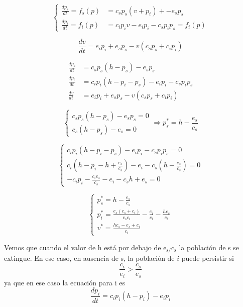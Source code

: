 \documentclass[twocolumn,aps,prl]{revtex4-1}
\begin{document}
$$
\left\{ 
    \begin{aligned}
        \frac{d p_{s}}{d t} = f_{s}(p) &= c_{s} p_{s}\left(v+p_{i}\right)+-e_{s} p_{s} \\
        \frac{d p_{i}}{d t} = f_{i}(p) &= c_{i} p_{i} v-e_{i} p_{i}-c_{s} p_{i} p_{s}=f_{i}(p)
    \end{aligned}
\right.
$$

$$
\frac{d v}{d t}=e_{i} p_{i}+e_{s} p_{s}-v\left(c_{s} p_{s}+c_{i} p_{i}\right)
$$

$$
\begin{aligned}
    \frac{d p_{s}}{d t} &= c_{s} p_{s}\left(h-p_{s}\right)-e_{s} p_{s} \\
    \frac{d p_{i}}{d t} &= c_{i} p_{i}\left(h-p_{i}-p_{s}\right)-e_{i} p_{i}-c_{s} p_{i} p_{s} \\
    \frac{d     v}{d t} &= e_{i} p_{i}+e_{s} p_{s}-v\left(c_{s} p_{s}+c_{i} p_{i}\right)
\end{aligned}
$$

$$
\left\{
\begin{array}{l}
    c_{s} p_{s}\left(h-p_{s}\right)-e_{s} p_{s}=0 \\
    c_{s}\left(h-p_{s}\right)-e_{s}=0
\end{array} 
\Rightarrow 
p_{s}^{*}=h-\frac{e_{s}}{c_{s}}
\right.
$$

\begin{equation}
    \left\{
    \begin{array}{l}
    c_{i} p_{i}\left(h-p_{i}-p_{s}\right)-e_{i} p_{i}-c_{s} p_{i} p_{s}=0 \\
    c_{i}\left(h-p_{i}-h+\frac{e_{s}}{c_{s}}\right)-e_{i}-c_{s}\left(h-\frac{e_{s}}{c_{s}}\right)=0 \\
    -c_{i} p_{i}-\frac{c_{i} e_{s}}{c_{s}}-e_{i}-c_{s} h+e_{s}=0
    \end{array}
    \right.
\end{equation}

\begin{equation}
    \left\{\begin{array}{l}
    p_{s}^{*}=h-\frac{e_{s}}{c_{s}} \\
    p_{i}^{*}=\frac{e_{s}\left(c_{s}+c_{i}\right)}{c_{s} c_{i}}-\frac{e_{i}}{c_{i}}-\frac{h c_{s}}{c_{i}} \\
    v^{*}=\frac{h c_{s}-e_{s}+e_{i}}{c_{i}}
    \end{array}\right.
\end{equation}

Vemos que cuando el valor de h está por debajo de $\mathrm{e}_{\mathrm{s} /} \mathrm{c}_{\mathrm{s}}$ la población de s se extingue. En ese caso, en ausencia de s, la población de $i$ puede persistir si
$$
\frac{c_{i}}{e_{i}}>\frac{c_{s}}{e_{s}}
$$
ya que en ese caso la ecuación para i es
$$
\frac{d p_{i}}{d t}=c_{i} p_{i}\left(h-p_{i}\right)-e_{i} p_{i}
$$
\end{document}
